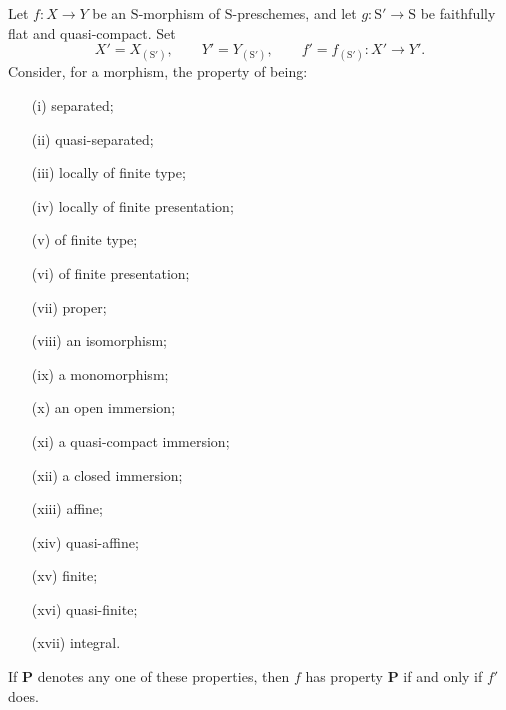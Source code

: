 \begin{proposition}[2.7.1]
\label{IV.2.7.1}
Let $f:X\to Y$ be an $\mathrm{S}$-morphism of $\mathrm{S}$-preschemes,
and let $g:\mathrm{S}'\to\mathrm{S}$ be faithfully flat and
quasi-compact. Set
\[
  X'=X_{(\mathrm{S}')},\qquad
  Y'=Y_{(\mathrm{S}')},\qquad
  f'=f_{(\mathrm{S}')}:X'\to Y'.
\]
Consider, for a morphism, the property of being:
\begin{enumerate}
  \item[\textup{(i)}] separated;
  \item[\textup{(ii)}] quasi-separated;
  \item[\textup{(iii)}] locally of finite type;
  \item[\textup{(iv)}] locally of finite presentation;
  \item[\textup{(v)}] of finite type;
  \item[\textup{(vi)}] of finite presentation;
  \item[\textup{(vii)}] proper;
  \item[\textup{(viii)}] \label{IV.2.7.1.viii}an isomorphism;
  \item[\textup{(ix)}] a monomorphism;
  \item[\textup{(x)}] an open immersion;
  \item[\textup{(xi)}] a quasi-compact immersion;
  \item[\textup{(xii)}] a closed immersion;
  \item[\textup{(xiii)}] affine;
  \item[\textup{(xiv)}] quasi-affine;
  \item[\textup{(xv)}] finite;
  \item[\textup{(xvi)}] quasi-finite;
  \item[\textup{(xvii)}] integral.
\end{enumerate}
If $\boldsymbol{P}$ denotes any one of these properties, then $f$ has
property $\boldsymbol{P}$ if and only if $f'$ does.
\end{proposition}


